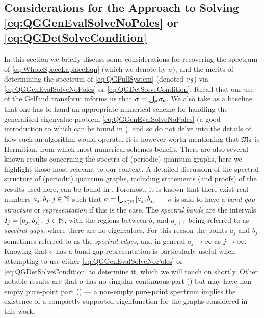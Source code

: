 \subsection{Considerations for the Approach to Solving \eqref{eq:QGGenEvalSolveNoPoles} or \eqref{eq:QGDetSolveCondition}} \label{ssec:ApproachConsiderations}
In this section we briefly discuss some considerations for recovering the spectrum of \eqref{eq:WholeSpaceLaplaceEqn} (which we denote by $\sigma$), and the merits of determining the spectrum of \eqref{eq:QGFullSystem} (denoted $\sigma_\theta$) via \eqref{eq:QGGenEvalSolveNoPoles} or \eqref{eq:QGDetSolveCondition}.
Recall that our use of the Gelfand transform informs us that $\sigma = \bigcup_{\theta}\sigma_{\theta}$.
We also take as a baseline that one has to hand an appropriate numerical scheme for handling the generalised eigenvalue problem \eqref{eq:QGGenEvalSolveNoPoles} (a good introduction to which can be found in \cite{guttel2017nonlinear}), and so do not delve into the details of how such an algorithm would operate.
It is however worth mentioning that $\mathfrak{M}_\theta$ is Hermitian, from which most numerical schemes benefit.
There are also several known results concerning the spectra of (periodic) quantum graphs, here we highlight those most relevant to our context. 
A detailed discussion of the spectral structure of (periodic) quantum graphs, including statements (and proofs) of the results used here, can be found in \cite[Chapter 4]{berkolaiko2013introduction}.
Foremost, it is known that there exist real numbers $a_j, b_j, j\in\mathbb{N}$ such that $\sigma = \bigcup_{j\in\mathbb{N}}\left[ a_j,b_j \right]$ --- $\sigma$ is said to have a \emph{band-gap structure} or \emph{representation} \cite[Chapter 4.3]{berkolaiko2013introduction} if this is the case.
The \emph{spectral bands} are the intervals $I_j=\left[ a_j,b_j \right], \ j\in\mathbb{N}$, with the regions between $b_j$ and $a_{j+1}$ being referred to as \emph{spectral gaps}, where there are no eigenvalues.
For this reason the points $a_j$ and $b_j$ sometimes referred to as the \emph{spectral edges}, and in general $a_j\rightarrow\infty$ as $j\rightarrow\infty$.
Knowing that $\sigma$ has a band-gap representation is particularly useful when attempting to use either \eqref{eq:QGGenEvalSolveNoPoles} or \eqref{eq:QGDetSolveCondition} to determine it, which we will touch on shortly.
Other notable results are that $\sigma$ has no singular continuous part (\cite[Chapter 4.4]{berkolaiko2013introduction}) but may have non-empty pure-point part (\cite[Chapter 4.5]{berkolaiko2013introduction}) --- a non-empty pure-point spectrum implies the existence of a compactly supported eigenfunction for the graphs considered in this work.

